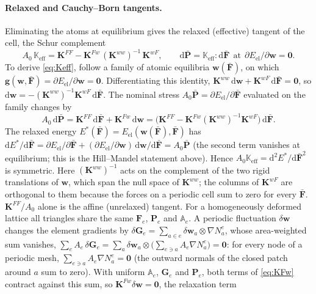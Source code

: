 \documentclass[11pt,a4paper]{article}
\newcommand{\Fb}{\bar{\mathbf F}}
\newcommand{\Pb}{\bar{\mathbf P}}
\newcommand{\F}{\mathbf F}
\newcommand{\Pk}{\mathbf P}
\newcommand{\w}{\mathbf w}
\newcommand{\G}{\mathbf G}
\begin{document}
\paragraph{Relaxed and Cauchy--Born tangents.}
Eliminating the atoms at equilibrium gives the relaxed (effective) tangent of the cell, the Schur
complement
\begin{equation}
  A_0\,\mathbb K_{\mathrm{eff}}=\mathbf K^{FF}-\mathbf K^{Fw}\,(\mathbf K^{ww})^{-1}\,\mathbf K^{wF},
  \qquad \mathrm d\Pb=\mathbb K_{\mathrm{eff}}:\mathrm d\Fb\ \ \text{at}\ \
  \partial E_{\mathrm{el}}/\partial\w=\mathbf 0 .
  \label{eq:Keff}
\end{equation}
To derive \eqref{eq:Keff}, follow a family of atomic equilibria \(\w(\Fb)\), on which
\(\mathbf g(\w,\Fb)=\partial E_{\mathrm{el}}/\partial\w=\mathbf 0\). Differentiating this identity,
\(\mathbf K^{ww}\,\mathrm d\w+\mathbf K^{wF}\,\mathrm d\Fb=\mathbf 0\), so
\(\mathrm d\w=-(\mathbf K^{ww})^{-1}\mathbf K^{wF}\,\mathrm d\Fb\). The nominal stress
\(A_0\Pb=\partial E_{\mathrm{el}}/\partial\Fb\) evaluated on the family changes by
\[
  A_0\,\mathrm d\Pb=\mathbf K^{FF}\,\mathrm d\Fb+\mathbf K^{Fw}\,\mathrm d\w
  =\big(\mathbf K^{FF}-\mathbf K^{Fw}(\mathbf K^{ww})^{-1}\mathbf K^{wF}\big)\,\mathrm d\Fb .
\]
The relaxed energy \(E^\ast(\Fb)=E_{\mathrm{el}}(\w(\Fb),\Fb)\) has
\(\mathrm dE^\ast/\mathrm d\Fb=\partial E_{\mathrm{el}}/\partial\Fb+(\partial E_{\mathrm{el}}/\partial\w)\,
\mathrm d\w/\mathrm d\Fb=A_0\Pb\) (the second term vanishes at equilibrium; this is the Hill--Mandel
statement above). Hence \(A_0\mathbb K_{\mathrm{eff}}=\mathrm d^2E^\ast/\mathrm d\Fb^2\) is symmetric. Here
\((\mathbf K^{ww})^{-1}\) acts on the complement of the two rigid translations of \(\w\), which span the
null space of \(\mathbf K^{ww}\); the columns of \(\mathbf K^{wF}\) are orthogonal to them because the
forces on a periodic cell sum to zero for every \(\Fb\).
\(\mathbf K^{FF}/A_0\) alone is the affine (unrelaxed) tangent. For a homogeneously deformed lattice all
triangles share the same \(\F_e\), \(\Pk_e\) and \(\mathbb A_e\). A periodic fluctuation \(\delta\w\)
changes the element gradients by \(\delta\G_e=\sum_{a\in e}\delta\w_a\otimes\nabla N^e_a\), whose
area-weighted sum vanishes,
\(\sum_eA_e\,\delta\G_e=\sum_a\delta\w_a\otimes\big(\sum_{e\ni a}A_e\nabla N^e_a\big)=\mathbf 0\): for every
node of a periodic mesh, \(\sum_{e\ni a}A_e\nabla N^e_a=\mathbf 0\) (the outward normals of the closed
patch around \(a\) sum to zero). With uniform \(\mathbb A_e\), \(\G_e\) and \(\Pk_e\), both terms of
\eqref{eq:KFw} contract against this sum, so \(\mathbf K^{Fw}\delta\w=\mathbf 0\), the relaxation term
\end{document}
